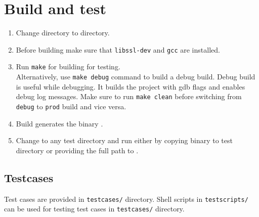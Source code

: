 \documentclass[12pt,letterpaper,titlepage, one-sided]{article}
\begin{document}
\section{Build and test \remodel}
	\begin{enumerate}
	\item
	Change directory to \remodel directory.
	\item
	Before building \remodel make sure that \texttt{libssl-dev} and \texttt{gcc} are installed.
	\item
	Run \texttt{make} for building \remodel for testing. \\Alternatively, use \texttt{make debug} command to build a debug build. Debug build is useful while debugging. It builds the project with gdb flags and enables debug log messages. Make sure to run \texttt{make clean} before switching from \texttt{debug} to \texttt{prod} build and vice versa.
	\item
	Build generates the binary \remodel. 
	\item
	Change to any test directory and run \remodel either by copying \remodel binary to test directory or providing the full path to \remodel.
	\end{enumerate}
\subsection{Testcases}
	Test cases are provided in \texttt{testcases/} directory. Shell scripts in \texttt{testscripts/} can be used for testing test cases in \texttt{testcases/} directory.
\end{document}
